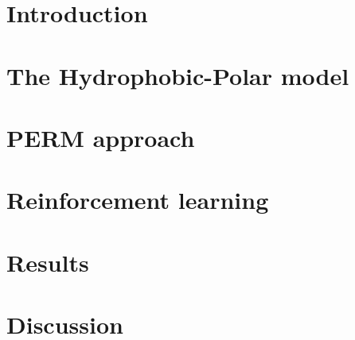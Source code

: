 \documentclass[12pt,a4paper]{article}
\title{}
\author{Gregorio Berselli, Isacco Faglioni}
\date{\today}
\begin{document}
\maketitle
\begin{center}
	\url{}
\end{center}

\begin{abstract}
\end{abstract}
\thispagestyle{empty}

\newpage
\thispagestyle{empty}
\addtocounter{page}{-2}
\mbox{}

\tableofcontents
\pagebreak

\section*{Introduction}

\pagebreak

\section{The Hydrophobic-Polar model}

\pagebreak

\section{PERM approach}

\pagebreak

\section{Reinforcement learning}

\pagebreak

\section{Results}

\pagebreak

\section{Discussion}

\pagebreak

\newpage
\thispagestyle{empty}
\mbox{}

\printbibliography
\end{document}
